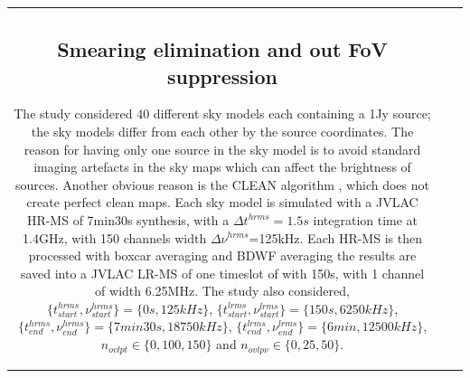 \documentclass[useAMS,usenatbib]{mn2e}
\begin{document}
\begin{tabular}{*3{c}}
\subsection{Smearing elimination and out FoV suppression}
The study considered $40$ different sky models each  containing a 1Jy source; the sky models differ from each other by the source 
coordinates. 
The reason for having  only one source in the sky model is to avoid standard imaging artefacts in the sky maps which 
can affect the brightness of sources. Another obvious reason is the  CLEAN algorithm \citep{cornwell1999deconvolution}, which does not 
create 
perfect clean maps. Each  sky model is simulated 
with a JVLAC HR-MS of 7min30s synthesis, with a $\Delta t^{hrms}=1.5s$ integration 
time at 1.4GHz,  with 150 channels width $\Delta \nu^{hrms}$=125kHz.  Each HR-MS is then processed with boxcar averaging and BDWF 
averaging the results are saved into a JVLAC LR-MS of one timeslot of with  150s,  with 1 channel of width 6.25MHz. The study also 
considered, $\{t^{hrms}_{start},\nu^{hrms}_{start}\}=\{0s,125kHz\}$, $\{t^{lrms}_{start},\nu^{lrms}_{start}\}=\{150s,6250kHz\}$, 
$\{t^{hrms}_{end},\nu^{hrms}_{end}\}=\{7min30s,18750kHz\}$, $\{t^{lrms}_{end},\nu^{lrms}_{end}\}=\{6min,12500kHz\}$, 
$n_{ovlpt}\in\{0,100,150\}$ 
and $n_{ovlp\nu}\in\{0,25,50\}$. 


\end{tabular}
\end{document}
